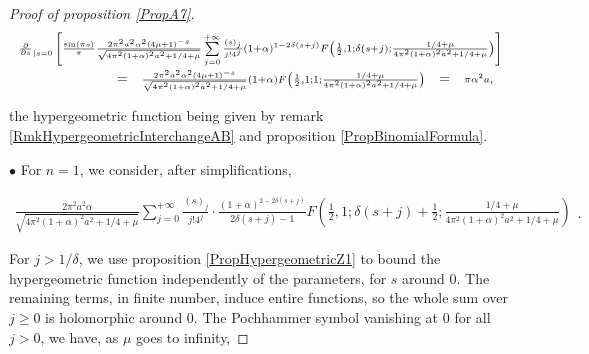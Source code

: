 \documentclass{jams-l}
\theoremstyle{definition}
\theoremstyle{remark}
\numberwithin{equation}{section}
\begin{document}
\begin{proof}[Proof of proposition \ref{PropA7}]
                    \[ \begin{array}{lllll}
                            \multicolumn{5}{l}{\scriptstyle \frac{\partial}{\partial s}_{\left \vert s = 0 \right.} \left[ \frac{\sin \left( \pi s \right)}{\pi} \frac{2 \pi^2 a^2 \alpha^2 \left( 4 \mu + 1 \right)^{-s}}{\sqrt{4 \pi^2 \left( 1 + \alpha \right)^2 a^2 + 1/4 + \mu}} \sum\limits_{j = 0}^{+ \infty} \frac{\left( s \right)_j}{j! 4^j} \left( 1 + \alpha \right)^{1 - 2 \delta \left( s + j \right)} F \left( \frac{1}{2}, 1; \delta \left( s + j \right); \frac{1/4 + \mu}{4 \pi^2 \left( 1 + \alpha \right)^2 a^2 + 1/4 + \mu} \right) \right]} \\[1em]
                        
                            \qquad \qquad \qquad & = & \scriptstyle \frac{2 \pi^2 a^2 \alpha^2 \left( 4 \mu + 1 \right)^{-s}}{\sqrt{4 \pi^2 \left( 1 + \alpha \right)^2 a^2 + 1/4 + \mu}} \left( 1 + \alpha \right) F \left( \frac{1}{2}, 1; 1; \frac{1/4 + \mu}{4 \pi^2 \left( 1 + \alpha \right)^2 a^2 + 1/4 + \mu} \right) & = & \scriptstyle \pi \alpha^2 a,
                        \end{array} \]
                
                    \noindent the hypergeometric function being given by remark \ref{RmkHypergeometricInterchangeAB} and proposition \ref{PropBinomialFormula}.
                
                    \medskip
                
                \hspace{10pt} $\bullet$ For $n = 1$, we consider, after simplifications,
                
                    \[ \begin{array}{l}
                            \scriptstyle \frac{2 \pi^2 a^2 \alpha}{\sqrt{4 \pi^2 \left( 1 + \alpha \right)^2 a^2 + 1/4 + \mu}} \sum\limits_{j=0}^{+\infty} \frac{\left( s \right)_j}{j! 4^j} \cdot \frac{\left( 1 + \alpha \right)^{2 - 2 \delta \left( s + j \right)}}{2 \delta \left( s + j \right) - 1} F \left( \frac{1}{2}, 1; \delta \left( s + j \right) + \frac{1}{2}; \frac{1/4 + \mu}{4 \pi^2 \left( 1 + \alpha \right)^2 a^2 + 1/4 + \mu} \right)
                        \end{array} . \]
                
                    \noindent For $j > 1/\delta$, we use proposition \ref{PropHypergeometricZ1} to bound the hypergeometric function independently of the parameters, for $s$ around $0$. The remaining terms, in finite number, induce entire functions, so the whole sum over $j \geqslant 0$ is holomorphic around $0$. The Pochhammer symbol vanishing at $0$ for all $j > 0$, we have, as $\mu$ goes to infinity,
                

\end{proof}
\end{document}
